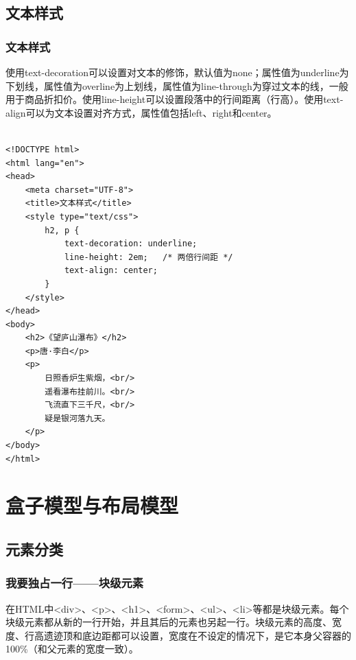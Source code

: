 \newpage

\section{文本样式}

\subsection{文本样式}

使用text-decoration可以设置对文本的修饰，默认值为none；属性值为underline为下划线，属性值为overline为上划线，属性值为line-through为穿过文本的线，一般用于商品折扣价。使用line-height可以设置段落中的行间距离（行高）。使用text-align可以为文本设置对齐方式，属性值包括left、right和center。 \\

 \\
\begin{lstlisting}[style=htmlcssjs]
<!DOCTYPE html>
<html lang="en">
<head>
    <meta charset="UTF-8">
    <title>文本样式</title>
    <style type="text/css">
        h2, p {
            text-decoration: underline;
            line-height: 2em;   /* 两倍行间距 */
            text-align: center;
        }
    </style>
</head>
<body>
    <h2>《望庐山瀑布》</h2>
    <p>唐·李白</p>
    <p>
        日照香炉生紫烟，<br/>
        遥看瀑布挂前川。<br/>
        飞流直下三千尺，<br/>
        疑是银河落九天。
    </p>
</body>
</html>
\end{lstlisting}

\newpage

\chapter{盒子模型与布局模型}

\section{元素分类}

\subsection{我要独占一行——块级元素}

在HTML中<div>、<p>、<h1>、<form>、<ul>、<li>等都是块级元素。每个块级元素都从新的一行开始，并且其后的元素也另起一行。块级元素的高度、宽度、行高遗迹顶和底边距都可以设置，宽度在不设定的情况下，是它本身父容器的100\%（和父元素的宽度一致）。 \\

